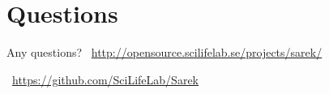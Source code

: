 \documentclass{beamer}
\begin{document}
{
	\section{Questions}
	\begin{frame}[plain]{Any questions?}
	\vspace{-6cm}
	\faGlobe\ \url{http://opensource.scilifelab.se/projects/sarek/}

	\faGithub\ \url{https://github.com/SciLifeLab/Sarek}
	\end{frame}
}
\end{document}
